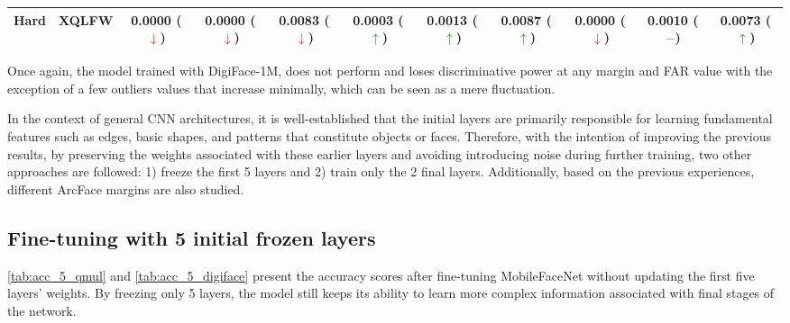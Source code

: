 \documentclass[class=report, crop=false, a4paper, 12pt]{standalone}
\begin{document}
\begin{table}[H]
{\begin{tabular}{cl|ccc|ccc|ccc|}
    \multicolumn{1}{|c|}{\multirow{-2}{*}{Hard}}    & XQLFW    & \multicolumn{1}{c|}{{\color[HTML]{333333} 0.0000 (\textcolor{red}{$\downarrow$})}} & \multicolumn{1}{c|}{{\color[HTML]{333333} 0.0000 (\textcolor{red}{$\downarrow$})}} & {\color[HTML]{333333} 0.0083 (\textcolor{red}{$\downarrow$})} & \multicolumn{1}{c|}{0.0003 (\textcolor{green}{$\uparrow$})} & \multicolumn{1}{c|}{0.0013 (\textcolor{green}{$\uparrow$})} & 0.0087 (\textcolor{green}{$\uparrow$}) & \multicolumn{1}{c|}{0.0000 (\textcolor{red}{$\downarrow$})} & \multicolumn{1}{c|}{0.0010 (\textcolor{gray}{$-$})} & 0.0073 (\textcolor{green}{$\uparrow$}) \\ \hline
    \end{tabular}%
    }
\end{table}

\par Once again, the model trained with DigiFace-1M, does not perform and loses discriminative power at any margin and FAR value with the exception of a few outliers values that increase minimally, which can be seen as a mere fluctuation. 

\vspace{\baselineskip}

\par In the context of general CNN architectures, it is well-established that the initial layers are primarily responsible for learning fundamental features such as edges, basic shapes, and patterns that constitute objects or faces. Therefore, with the intention of improving the previous results, by preserving the weights associated with these earlier layers and avoiding introducing noise during further training, two other approaches are followed: 1) freeze the first 5 layers and 2) train only the 2 final layers. Additionally, based on the previous experiences, different ArcFace margins are also studied.
\vspace{3mm}

\subsection*{Fine-tuning with 5 initial frozen layers}
\autoref{tab:acc_5_qmul} and \autoref{tab:acc_5_digiface} present the accuracy scores after fine-tuning MobileFaceNet without updating the first five layers' weights. By freezing only 5 layers, the model still keeps its ability to learn more complex information associated with final stages of the network.
\end{document}
